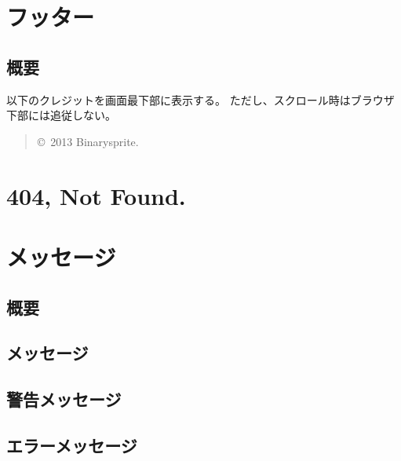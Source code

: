     \section{フッター}
        \subsection{概要}
            以下のクレジットを画面最下部に表示する。
            ただし、スクロール時はブラウザ下部には追従しない。

            \begin{quote}
                \copyright \, 2013 Binarysprite.
            \end{quote}

    \section{404, Not Found.}
    \section{メッセージ}
        \subsection{概要}
        \subsection{メッセージ}
        \subsection{警告メッセージ}
        \subsection{エラーメッセージ}


